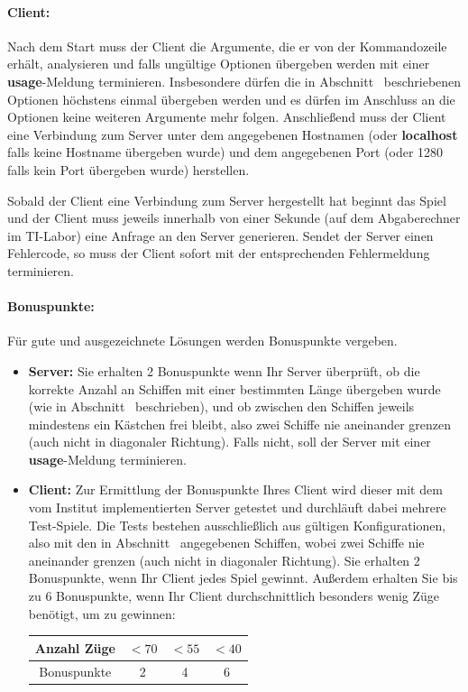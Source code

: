 \paragraph{Client:}
Nach dem Start muss der Client die Argumente, die er von der Kommandozeile erhält, analysieren
und falls ungültige Optionen übergeben werden mit einer \textbf{usage}-Meldung terminieren.
Insbesondere dürfen die in Abschnitt~ beschriebenen Optionen höchstens einmal
übergeben werden und es dürfen im Anschluss an die Optionen keine weiteren Argumente mehr folgen.
Anschließend muss der Client eine Verbindung zum Server unter dem angegebenen Hostnamen (oder \textbf{localhost}
falls keine Hostname übergeben wurde) und dem angegebenen Port (oder 1280 falls kein Port übergeben wurde)
herstellen.

Sobald der Client eine Verbindung zum Server hergestellt hat beginnt das Spiel
und der Client muss jeweils innerhalb von einer Sekunde (auf
dem Abgaberechner im TI-Labor) eine Anfrage an den Server generieren.
Sendet der Server einen Fehlercode, so muss der Client sofort mit der
entsprechenden Fehlermeldung terminieren.

\paragraph{Bonuspunkte:} Für gute und ausgezeichnete Lösungen werden Bonuspunkte vergeben.

\begin{itemize}
    \item \textbf{Server:} Sie erhalten 2 Bonuspunkte wenn Ihr Server überprüft,
    ob die korrekte Anzahl an Schiffen mit einer bestimmten Länge übergeben wurde (wie in Abschnitt~ beschrieben),
    und ob zwischen den Schiffen jeweils mindestens ein Kästchen frei bleibt, also zwei Schiffe nie aneinander grenzen
    (auch nicht in diagonaler Richtung). Falls nicht, soll der Server mit einer \textbf{usage}-Meldung terminieren.
    \item \textbf{Client:} Zur Ermittlung der Bonuspunkte Ihres Client wird dieser mit dem vom Institut implementierten Server getestet
    und durchläuft dabei mehrere Test-Spiele. Die Tests bestehen ausschließlich aus gültigen Konfigurationen,
    also mit den in Abschnitt~ angegebenen Schiffen,
    wobei zwei Schiffe nie aneinander grenzen (auch nicht in diagonaler Richtung).
    Sie erhalten 2 Bonuspunkte, wenn Ihr Client jedes Spiel gewinnt.
    Außerdem erhalten Sie bis zu 6 Bonuspunkte, wenn Ihr Client durchschnittlich besonders wenig Züge benötigt, um zu gewinnen:

    \vspace{3pt}
    {\centering
    \begin{tabular}{| c | c | c | c |}
    \hline
    Anzahl Züge & $<70$ & $<55$ & $<40$ \\
    \hline
    Bonuspunkte & 2 & 4 & 6 \\
    \hline
    \end{tabular} \par
    }
\end{itemize}

\osueguidelinesone



